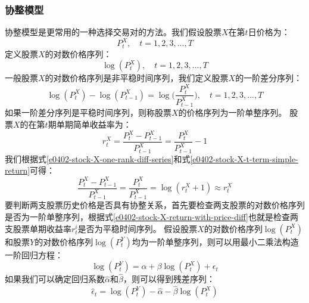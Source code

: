 \subsubsection{协整模型}
协整模型是更常用的一种选择交易对的方法。我们假设股票$X$在第$t$日价格为：
\begin{equation}
P_{t}^{X}, \quad t=1, 2, 3, ..., T
\label{e0402-stock-X-price-t}
\end{equation}
定义股票$X$的对数价格序列：
\begin{equation}
\log (P_{t}^{X}), \quad t=1, 2, 3, ..., T
\label{e0402-stock-X-log-price-t}
\end{equation}
一般股票$X$的对数价格序列是非平稳时间序列，我们定义股票$X$的一阶差分序列：
\begin{equation}
\log (P_{t}^{X}) - \log (P_{t-1}^{X}) = \log \Big( \frac{ P_{t}^{X} }{ P_{t-1}^{X} } \Big), \quad t=1, 2, 3, ..., T
\label{e0402-stock-X-one-rank-diff-series}
\end{equation}
如果一阶差分序列是平稳时间序列，则称股票$X$的价格序列为一阶单整序列。\newline
股票$X$的在第$t$期单期简单收益率为：
\begin{equation}
r_{t}^{X} = \frac{ P_{t}^{X} - P_{t-1}^{X} }{P_{t-1}^{X}} = \frac{ P_{t}^{X} }{P_{t-1}^{X}} - 1
\label{e0402-stock-X-t-term-simple-return}
\end{equation}
我们根据式\ref{e0402-stock-X-one-rank-diff-series}和式\ref{e0402-stock-X-t-term-simple-return}可得：
\begin{equation}
\frac{ P_{t}^{X} - P_{t-1}^{X} }{P_{t-1}^{X}} = \frac{ P_{t}^{X} }{P_{t-1}^{X}} = \log(r_{t}^{X} + 1) \approx r_{t}^{X}
\label{e0402-stock-X-return-with-price-diff}
\end{equation}
要判断两支股票历史价格是否具有协整关系，首先要检查两支股票的对数价格序列是否为一阶单整序列，根据式\ref{e0402-stock-X-return-with-price-diff}也就是检查两支股票单期收益率$r_{t}^{i}$是否为平稳时间序列。\newline
假设股票$X$的对数价格序列$\log \left( P_{t}^{X} \right)$和股票$Y$的对数价格序列$\log \left( P_{t}^{Y} \right)$均为一阶单整序列，则可以用最小二乘法构造一阶回归方程：
\begin{equation}
\log \left( P_{t}^{Y} \right) = \alpha + \beta \log \left( P_{t}^{X} \right) + \epsilon _{t}
\label{e0402-one-rank-regression-equation}
\end{equation}
如果我们可以确定回归系数$\hat{\alpha}$和$\hat{\beta}$，则可以得到残差序列：
\begin{equation}
\hat{\epsilon} _{t} = \log \left( P_{t}^{Y} \right) - \hat{\alpha} - \hat{\beta} \log \left( P_{t}^{X} \right) 
\label{e0402-one-rank-regression-equation-residue}
\end{equation}
